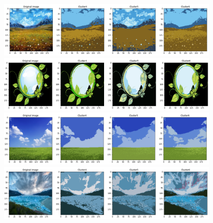 \documentclass{article}
\begin{document}
\newpage

\begin{figure}[h!]
\centerline{\includegraphics[scale=0.45]{images/segmented_k_means1.png}}
\centerline{\includegraphics[scale=0.45]{images/segmented_k_means3.png}}
\centerline{\includegraphics[scale=0.45]{images/segmented_k_means4.png}}
\centerline{\includegraphics[scale=0.45]{images/segmented_k_means5.png}}
\end{figure}

\newpage
\end{document}
